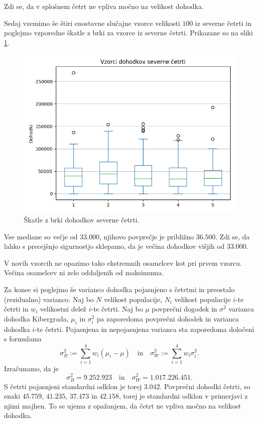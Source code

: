 \documentclass[12pt, a4paper]{article}
\begin{document}
Zdi se, da v splošnem četrt ne vpliva močno na velikost dohodka.


Sedaj vzemimo še štiri enostavne slučajne vzorce velikosti $100$ 
iz severne četrti in poglejmo vzporedne škatle z brki za vzorce
iz severne četrti. Prikazane so na sliki \ref{img:sever}.
\begin{figure}[H]
    \centering
    \includegraphics[width=12cm]{Slike/sever.png}
    \caption{Škatle z brki dohodkov severne četrti.}
    \label{img:sever}
\end{figure}
Vse mediane so večje od $33.000$, njihovo povprečje je približno 
$36.500$. Zdi se, da lahko s precejšnjo sigurnostjo sklepamo, da je večina 
dohodkov višjih od $33.000$.

V novih vzorcih ne opazimo tako ekstremnih osamelcev kot pri prvem vzorcu. Večina 
osamelcev ni zelo oddaljenih od maksimuma.

Za konec si poglejmo še varianco dohodka pojasnjeno s četrtmi in preostalo
(rezidualno) varianco. Naj bo $N$ velikost populacije, $N_i$ velikost 
populacije $i$-te četrti in $w_i$ velikostni delež $i$-te četrti. Naj bo
$\mu$ povprečni dogodek in $\sigma^2$ varianca dohodka Kibergrada,
$\mu_i$ in $\sigma_i^2$ pa zaporedoma povprečni dohodek in varianca 
dohodka $i$-te četrti. Pojasnjena in nepojasnjena varianca sta zaporedoma 
določeni s formulama
\[
    \sigma^2_B := \sum_{i=1}^{4} w_i(\mu_i - \mu)
    \quad \text{in} \quad
    \sigma^2_W := \sum_{i=1}^{4} w_i\sigma_i^2.
\]
Izračunamo, da je 
\[
    \sigma^2_B = 9.252.923
    \quad \text{in} \quad
    \sigma^2_W = 1.017.226.451.
\]
S četrti pojasnjeni 
standardni odklon je torej $3.042$. Povprečni dohodki četrti, 
so enaki $45.759$, $41.235$, $37.473$ in $42.158$, torej je 
standardni odklon v primerjavi z njimi majhen. To se ujema z 
opažanjem, da četrt ne vpliva močno na velikost dohodka.
\newpage
\end{document}

